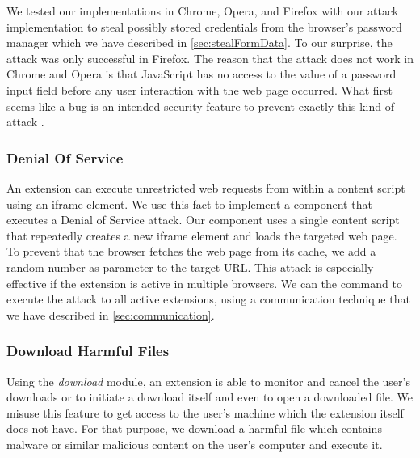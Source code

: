 	We tested our implementations in Chrome, Opera, and Firefox with our attack implementation to steal possibly stored credentials from the browser's password manager which we have described in \autoref{sec:stealFormData}. To our surprise, the attack was only successful in Firefox. The reason that the attack does not work in Chrome and Opera is that JavaScript has no access to the value of a password input field before any user interaction with the web page occurred. What first seems like a bug is an intended security feature to prevent exactly this kind of attack \cite{chromiumBlogPasswordInput}.


\subsubsection{Denial Of Service}
\label{sec:DoS}
	
	An extension can execute unrestricted web requests from within a content script using an iframe element. We use this fact to implement a component that executes a Denial of Service attack. Our component uses a single content script that repeatedly creates a new iframe element and loads the targeted web page. To prevent that the browser fetches the web page from its cache, we add a random number as parameter to the target URL. This attack is especially effective if the extension is active in multiple browsers. We can the command to execute the attack to all active extensions, using a communication technique that we have described in \autoref{sec:communication}.

\subsubsection{Download Harmful Files}
\label{sec:downloads}

	Using the \textit{download} module, an extension is able to monitor and cancel the user's downloads or to initiate a download itself and even to open a downloaded file. We misuse this feature to get access to the user's machine which the extension itself does not have. For that purpose, we download a harmful file which contains malware or similar malicious content on the user's computer and execute it. 
	
